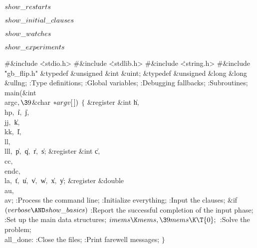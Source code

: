 \par
\B\4\D$\\{show\_restarts}$ \5
\par
\B\4\D$\\{show\_initial\_clauses}$ \5
\par
\B\4\D$\\{show\_watches}$ \5
\par
\B\4\D$\\{show\_experiments}$ \5
\par
\Y\B\8\#\&{include} \.{<stdio.h>}\6
\8\#\&{include} \.{<stdlib.h>}\6
\8\#\&{include} \.{<string.h>}\6
\8\#\&{include} \.{"gb\_flip.h"}\6
\&{typedef} \&{unsigned} \&{int} \&{uint};\6
\&{typedef} \&{unsigned} \&{long} \&{long} \&{ullng};\7
:Type definitions\X;\6
:Global variables\X;\6
:Debugging fallbacks\X;\6
:Subroutines\X;\7
\\{main}(\&{int} \\{argc}${},\39{}$\&{char} ${}{*}\\{argv}[\,]){}$\1\1\2\2\6
${}\{{}$\1\6
\&{register} \&{int} \|h${},{}$ \\{hp}${},{}$ \|i${},{}$ \|j${},{}$ %
\\{jj}${},{}$ \|k${},{}$ \\{kk}${},{}$ \|l${},{}$ \\{ll}${},{}$ \\{lll}${},{}$ %
\|p${},{}$ \|q${},{}$ \|r${},{}$ \|s;\6
\&{register} \&{int} \|c${},{}$ \\{cc}${},{}$ \\{endc}${},{}$ \\{la}${},{}$ %
\|t${},{}$ \|u${},{}$ \|v${},{}$ \|w${},{}$ \|x${},{}$ \|y;\6
\&{register} \&{double} \\{au}${},{}$ \\{av};\7
:Process the command line\X;\6
:Initialize everything\X;\6
:Input the clauses\X;\6
\&{if} ${}(\\{verbose}\AND\\{show\_basics}){}$\1\5
:Report the successful completion of the input phase\X;\2\6
:Set up the main data structures\X;\6
${}\\{imems}\K\\{mems},\39\\{mems}\K\T{0};{}$\6
:Solve the problem\X;\6
\4\\{all\_done}:\5
:Close the files\X;\6
:Print farewell messages\X;\6
\4${}\}{}$\2\par
\fi

